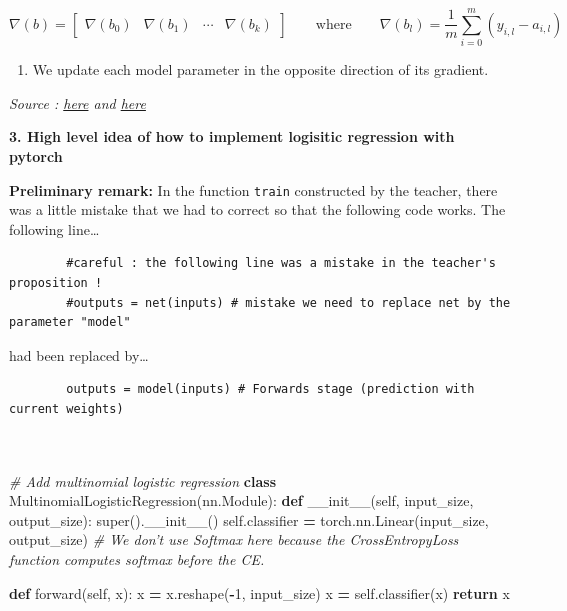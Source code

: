 \documentclass[10pt,a4paper]{article}
\newenvironment{Shaded}{\begin{snugshade}}{\end{snugshade}}
\newcommand{\BuiltInTok}[1]{#1}
\newcommand{\CommentTok}[1]{\textcolor[rgb]{0.56,0.35,0.01}{\textit{#1}}}
\newcommand{\ControlFlowTok}[1]{\textcolor[rgb]{0.13,0.29,0.53}{\textbf{#1}}}
\newcommand{\DecValTok}[1]{\textcolor[rgb]{0.00,0.00,0.81}{#1}}
\newcommand{\FunctionTok}[1]{\textcolor[rgb]{0.00,0.00,0.00}{#1}}
\newcommand{\KeywordTok}[1]{\textcolor[rgb]{0.13,0.29,0.53}{\textbf{#1}}}
\newcommand{\NormalTok}[1]{#1}
\newcommand{\OperatorTok}[1]{\textcolor[rgb]{0.81,0.36,0.00}{\textbf{#1}}}
\newcommand{\VariableTok}[1]{\textcolor[rgb]{0.00,0.00,0.00}{#1}}
\providecommand{\tightlist}{%
  \setlength{\parskip}{0pt}
  }
\theoremstyle{break}
\begin{document}
\[\nabla (b) = 
\begin{bmatrix}
\nabla (b_{0}) & \nabla (b_{1}) & \cdots & \nabla (b_{k})
\end{bmatrix} \qquad \text{where} \qquad \nabla (b_{l}) = \frac{1}{m} \sum_{i=0}^{m} \left( y_{i, l} - a_{i, l} \right)\]

\begin{enumerate}
\def\labelenumi{\arabic{enumi}.}
\setcounter{enumi}{1}
\tightlist
\item
  We update each model parameter in the opposite direction of its gradient.
\end{enumerate}

\emph{Source : \href{https://aaronkub.com/2020/02/12/logistic-regression-with-pytorch.html}{here} and \href{https://towardsdatascience.com/logistic-regression-on-mnist-with-pytorch-b048327f8d19}{here}}

\textbf{3. High level idea of how to implement logisitic regression with pytorch}

\textbf{Preliminary remark:} In the function \texttt{train} constructed by the teacher, there was a little mistake that we had to correct so that the following code works. The following line\ldots{}

\begin{verbatim}
        #careful : the following line was a mistake in the teacher's proposition ! 
        #outputs = net(inputs) # mistake we need to replace net by the parameter "model"
\end{verbatim}

had been replaced by\ldots{}

\begin{verbatim}
        outputs = model(inputs) # Forwards stage (prediction with current weights)
        
      
\end{verbatim}

\begin{Shaded}
\begin{Highlighting}[]
\CommentTok{# Add multinomial logistic regression}
\KeywordTok{class}\NormalTok{ MultinomialLogisticRegression(nn.Module):}
    \KeywordTok{def} \FunctionTok{__init__}\NormalTok{(}\VariableTok{self}\NormalTok{, input_size, output_size):}
        \BuiltInTok{super}\NormalTok{().}\FunctionTok{__init__}\NormalTok{()}
        \VariableTok{self}\NormalTok{.classifier }\OperatorTok{=}\NormalTok{ torch.nn.Linear(input_size, output_size)}
        \CommentTok{# We don't use Softmax here because the CrossEntropyLoss function computes softmax before the CE.}

    \KeywordTok{def}\NormalTok{ forward(}\VariableTok{self}\NormalTok{, x):}
\NormalTok{        x }\OperatorTok{=}\NormalTok{ x.reshape(}\OperatorTok{-}\DecValTok{1}\NormalTok{, input_size)}
\NormalTok{        x }\OperatorTok{=} \VariableTok{self}\NormalTok{.classifier(x)}
        \ControlFlowTok{return}\NormalTok{ x}
\end{Highlighting}
\end{Shaded}
\end{document}
